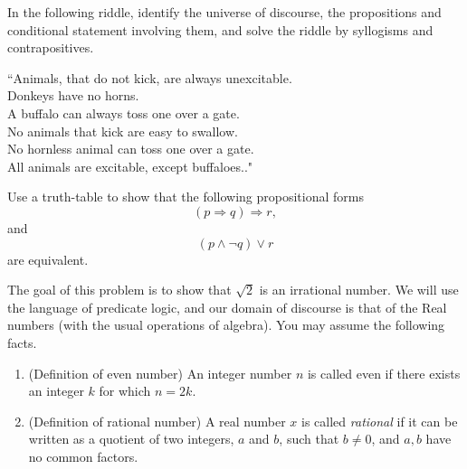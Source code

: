 \documentclass[11pt]{exam}
\begin{document}
%
%
%

\begin{questions}


\addpoints 
\question[4] In the following riddle, identify the universe of discourse, the propositions and conditional statement involving them, and solve the riddle by syllogisms and contrapositives. 
\begin{center}
``Animals, that do not kick, are always unexcitable.\\
Donkeys have no horns.\\
A buffalo can always toss one over a gate.\\
No animals that kick are easy to swallow.\\
No hornless animal can toss one over a gate.\\
All animals are excitable, except buffaloes.."
\end{center}
\vfill
\newpage


\addpoints
\question[4] Use a truth-table to show that the following propositional forms
\begin{equation*}
(p \Rightarrow q) \Rightarrow r,
\end{equation*}
and 
\begin{equation*}
(p \land \neg q) \lor r
\end{equation*}
are equivalent. 
\newpage 


\addpoints 
\question The goal of this problem is to show that $\sqrt{2}$ is an irrational number. We will use the language of predicate logic, and our domain of discourse is that of the Real numbers (with the usual operations of algebra). You may assume the following facts. 

\begin{enumerate}
\item (Definition of even number) An integer number $n$ is called even if there exists an integer $k$ for which $n=2k$.
\item (Definition of rational number) A real number $x$ is called \textit{rational} if it can be written as a quotient of two integers, $a$ and $b$, such that $b \neq 0$, and $a,b$ have no common factors. 
\end{enumerate}


\end{questions}
\end{document}
